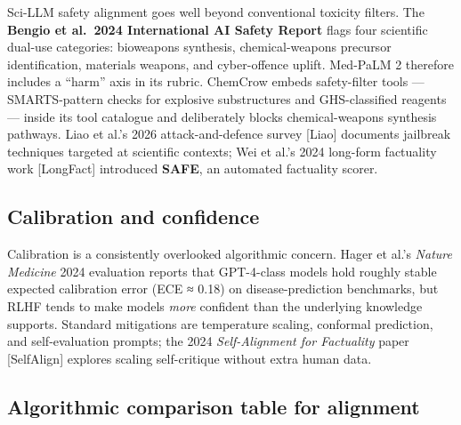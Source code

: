 \documentclass{article}
\begin{document}
Sci-LLM safety alignment goes well beyond conventional toxicity filters. The \textbf{Bengio et al.~2024 International AI Safety Report} \cite{bengio2024internationalscien} flags four scientific dual-use categories: bioweapons synthesis, chemical-weapons precursor identification, materials weapons, and cyber-offence uplift. Med-PaLM 2 \cite{singhal2025towardexpertlevelm} therefore includes a ``harm'' axis in its rubric. ChemCrow \cite{bran2024naturemachineintel} embeds safety-filter tools --- SMARTS-pattern checks for explosive substructures and GHS-classified reagents --- inside its tool catalogue and deliberately blocks chemical-weapons synthesis pathways. Liao et al.'s 2026 attack-and-defence survey {[}Liao{]} documents jailbreak techniques targeted at scientific contexts; Wei et al.'s 2024 long-form factuality work {[}LongFact{]} introduced \textbf{SAFE}, an automated factuality scorer.

\subsection{Calibration and confidence}\label{calibration-and-confidence}

Calibration is a consistently overlooked algorithmic concern. Hager et al.'s \emph{Nature Medicine} 2024 evaluation \cite{hager2024evaluationandmitig} reports that GPT-4-class models hold roughly stable expected calibration error (ECE ≈ 0.18) on disease-prediction benchmarks, but RLHF tends to make models \emph{more} confident than the underlying knowledge supports. Standard mitigations are temperature scaling, conformal prediction, and self-evaluation prompts; the 2024 \emph{Self-Alignment for Factuality} paper {[}SelfAlign{]} explores scaling self-critique without extra human data.

\subsection{Algorithmic comparison table for alignment}\label{algorithmic-comparison-table-for-alignment}
\end{document}
